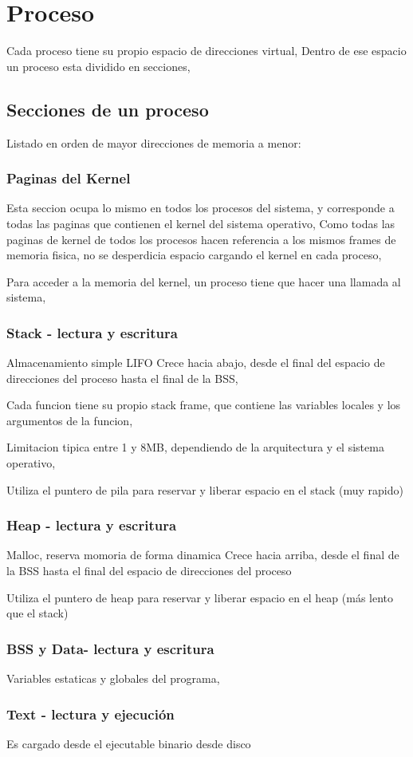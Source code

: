 \section{Proceso}

Cada proceso tiene su propio espacio de direcciones virtual,
Dentro de ese espacio un proceso esta dividido en secciones,

\subsection{Secciones de un proceso}

Listado en orden de mayor direcciones de memoria a menor:

\subsubsection{Paginas del Kernel}

Esta seccion ocupa lo mismo en todos los procesos del sistema,
y corresponde a todas las paginas que contienen el kernel del sistema operativo,
Como todas las paginas de kernel de todos los procesos hacen referencia a los mismos frames de memoria fisica,
no se desperdicia espacio cargando el kernel en cada proceso,

Para acceder a la memoria del kernel, un proceso tiene que hacer una llamada al sistema,

\subsubsection{Stack - lectura y escritura}

Almacenamiento simple LIFO
Crece hacia abajo, desde el final del espacio de direcciones del proceso hasta el final de la BSS,

Cada funcion tiene su propio stack frame, que contiene las variables locales y los argumentos de la funcion,

Limitacion tipica entre 1 y 8MB, dependiendo de la arquitectura y el sistema operativo,

Utiliza el puntero de pila para reservar y liberar espacio en el stack (muy rapido)

\subsubsection{Heap - lectura y escritura}

Malloc, reserva momoria de forma dinamica
Crece hacia arriba, desde el final de la BSS hasta el final del espacio de direcciones del proceso

Utiliza el puntero de heap para reservar y liberar espacio en el heap (más lento que el stack)

\subsubsection{BSS y Data- lectura y escritura}

Variables estaticas y globales del programa,

\subsubsection{Text - lectura y ejecución}

Es cargado desde el ejecutable binario desde disco







